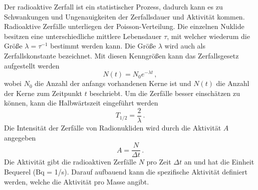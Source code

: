 Der radioaktive Zerfall ist ein statistischer Prozess, dadurch kann es zu Schwankungen und Ungenauigkeiten der Zerfallsdauer und Aktivität kommen.
Radioaktive Zerfälle unterliegen der Poisson-Verteilung. Die einzelnen Nuklide besitzen eine unterschiedliche mittlere Lebensdauer $\tau $, mit welcher wiederum die Größe $\lambda= \tau^{-1}$ bestimmt werden kann.
Die Größe $\lambda $ wird auch als Zerfallskonstante bezeichnet.
Mit diesen Kenngrößen kann das Zerfallsgesetz aufgestellt werden
\begin{equation*}
    N(t)= N_0 e^{-\lambda t} \, ,
\end{equation*}
wobei $N_0$ die Anzahl der anfangs vorhandenen Kerne ist und $N(t)$ die Anzahl der Kerne zum Zeitpunkt $t$ beschriebt.
Um die Zerfälle besser einschätzen zu können, kann die Halbwärtszeit eingeführt werden
\begin{equation*}
    T_{1/2}= \frac{\text{2}}{\lambda}\, . 
\end{equation*} 
Die Intensität der Zerfälle von Radionukliden wird durch die Aktivität $A$ angegeben
\begin{equation}
    A=\frac{N}{\Delta t}\, .
    \label{eqn:Aktivität}
\end{equation}
Die Aktivität gibt die radioaktiven Zerfälle $N$ pro Zeit $\Delta t$ an und hat die Einheit Bequerel (Bq = 1/s).
Darauf aufbauend kann die spezifische Aktivität definiert werden, welche die Aktivität pro Masse angibt.  